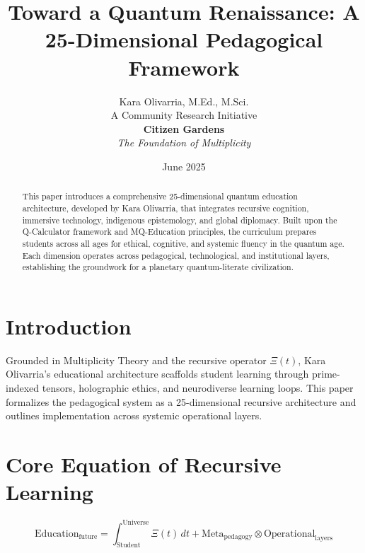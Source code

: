 \documentclass[11pt]{article}
\title{\textbf{Toward a Quantum Renaissance: A 25-Dimensional Pedagogical Framework}}
\author{Kara Olivarria, M.Ed., M.Sci.\\ A Community Research Initiative \\ \textbf{ Citizen Gardens} \\ \textit {The Foundation of Multiplicity}}
\date{June 2025}
\theoremstyle{plain}
\theoremstyle{definition}
\begin{document}
\maketitle

\begin{abstract}
This paper introduces a comprehensive 25-dimensional quantum education architecture, developed by Kara Olivarria, that integrates recursive cognition, immersive technology, indigenous epistemology, and global diplomacy. Built upon the Q-Calculator framework and MQ-Education principles, the curriculum prepares students across all ages for ethical, cognitive, and systemic fluency in the quantum age. Each dimension operates across pedagogical, technological, and institutional layers, establishing the groundwork for a planetary quantum-literate civilization.
\end{abstract}

\section{Introduction}
Grounded in Multiplicity Theory and the recursive operator \(\Xi(t)\), Kara Olivarria's educational architecture scaffolds student learning through prime-indexed tensors, holographic ethics, and neurodiverse learning loops. This paper formalizes the pedagogical system as a 25-dimensional recursive architecture and outlines implementation across systemic operational layers.

\section{Core Equation of Recursive Learning}
\begin{equation}
\text{Education}_{\text{future}} = \int_{\text{Student}}^{\text{Universe}} \Xi(t) \, dt + \text{Meta}_{\text{pedagogy}} \otimes \text{Operational}_{\text{layers}}
\end{equation}
\end{document}
